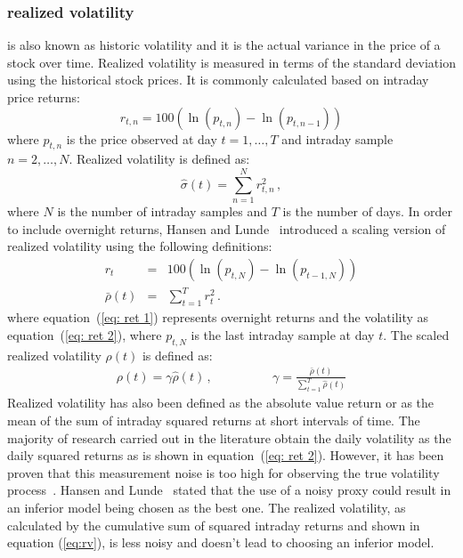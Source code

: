\subsubsection{realized volatility} is also known as historic volatility and
it is the actual variance in the price of a stock over time.
Realized volatility is measured in terms of the standard deviation
using the historical stock prices. It is commonly calculated based on
intraday price returns:
\begin{equation}
\label{eq:retintra}
r_{t,n}=100(\ln(p_{t,n}) - \ln(p_{t,n-1}))
\end{equation}
\noindent where $p_{t,n}$ is the price observed at day $t=1,\dots,T$ and
intraday sample $n=2,\dots,N$. Realized volatility is defined as:
\begin{equation}
\label{eq:rv}
    \hat{\sigma}(t) = \sum_{n=1}^N r_{t,n}^2 \, , 
\end{equation}
\noindent where $N$ is the number of intraday samples and $T$ is the
number of days. 
In order to include overnight returns, Hansen and
Lunde~\cite{hansen+lunde2005} introduced a scaling version of
realized volatility using the following definitions:
\begin{eqnarray}
r_{t}&=&100(\ln(p_{t,N}) - \ln(p_{t-1,N})) \label{eq: ret 1} \\
\bar{\rho}(t) &=& \sum_{t=1}^T r_{t}^2  \label{eq: ret 2} \, .
\end{eqnarray}
\noindent where equation~(\ref{eq: ret 1}) represents overnight 
returns and the volatility as 
equation~(\ref{eq: ret 2}), where $p_{t,N}$ is the last intraday 
sample at day $t$. The scaled realized volatility $\rho(t)$ is 
defined as:
\begin{eqnarray}
\label{eq:srv}
\rho(t) = \gamma \hat{\rho}(t) \, , \qquad & \qquad \gamma = \displaystyle \frac{\bar{\rho}(t)}{\displaystyle\sum_{t=1}^T \hat{\rho}(t)}
\end{eqnarray}
Realized volatility has also been defined as the absolute value return or as
the mean of the sum of intraday squared returns at short intervals of time. The
majority of research carried out in the literature obtain the daily volatility
as the daily squared returns as is shown in equation~(\ref{eq: ret 2}).
However, it has been proven that this measurement noise is too high for
observing the true volatility process~\cite{andersen+bollerslev1998}. Hansen
and Lunde~\cite{hansen+lunde2006} stated that the use of a noisy proxy could
result in an inferior model being chosen as the best one. The realized
volatility, as calculated by the cumulative sum of squared intraday returns and
shown in equation (\ref{eq:rv}), is less noisy and doesn't lead to choosing an
inferior model.   
